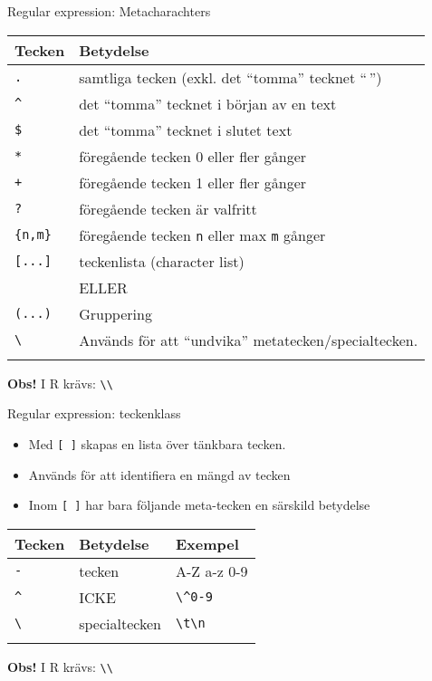 \documentclass[
  10pt,
  ignorenonframetext,
  handout]{beamer}
\providecommand{\tightlist}{%
  \setlength{\itemsep}{0pt}\setlength{\parskip}{0pt}}
\begin{document}
\begin{frame}[fragile]{Regular expression: Metacharachters}
\label{regular-expression-metacharachters}
\begin{longtable}[]{@{}ll@{}}
\toprule\noalign{}
Tecken & Betydelse \\
\midrule\noalign{}
\endhead
\texttt{.} & samtliga tecken (exkl. det ``tomma'' tecknet ``\,'') \\
\texttt{\^{}} & det ``tomma'' tecknet i början av en text \\
\texttt{\$} & det ``tomma'' tecknet i slutet text \\
\texttt{*} & föregående tecken 0 eller fler gånger \\
\texttt{+} & föregående tecken 1 eller fler gånger \\
\texttt{?} & föregående tecken är valfritt \\
\texttt{\{n,m\}} & föregående tecken \texttt{n} eller max \texttt{m}
gånger \\
\texttt{{[}...{]}} & teckenlista (character list) \\
\textbar{} & ELLER \\
\texttt{(...)} & Gruppering \\
\texttt{\textbackslash{}} & Används för att ``undvika''
metatecken/specialtecken. \\
\bottomrule\noalign{}
\end{longtable}

\textbf{Obs!} I R krävs: \texttt{\textbackslash{}\textbackslash{}}
\end{frame}

\begin{frame}[fragile]{Regular expression: teckenklass}
\label{regular-expression-teckenklass}
\begin{itemize}
\tightlist
\item
  Med \texttt{{[}\ {]}} skapas en lista över tänkbara tecken.
\item
  Används för att identifiera en mängd av tecken
\item
  Inom \texttt{{[}\ {]}} har bara följande meta-tecken en särskild
  betydelse
\end{itemize}

\begin{longtable}[]{@{}lll@{}}
\toprule\noalign{}
Tecken & Betydelse & Exempel \\
\midrule\noalign{}
\endhead
\texttt{-} & tecken & A-Z a-z 0-9 \\
\texttt{\^{}} & ICKE & \texttt{\textbackslash{}\^{}0-9} \\
\texttt{\textbackslash{}} & specialtecken &
\texttt{\textbackslash{}t\textbackslash{}n} \\
\bottomrule\noalign{}
\end{longtable}

\textbf{Obs!} I R krävs: \texttt{\textbackslash{}\textbackslash{}}
\end{frame}
\end{document}
